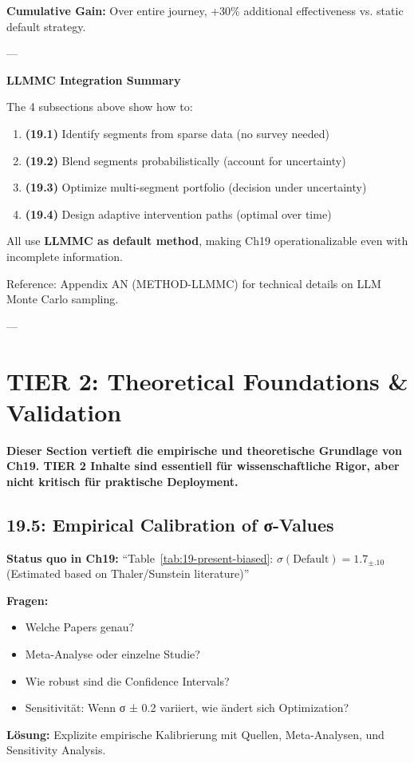 \textbf{Cumulative Gain:} Over entire journey, +30\% additional effectiveness vs. static default strategy.

---

\textbf{LLMMC Integration Summary}

The 4 subsections above show how to:
\begin{enumerate}[nosep]
\item \textbf{(19.1)} Identify segments from sparse data (no survey needed)
\item \textbf{(19.2)} Blend segments probabilistically (account for uncertainty)
\item \textbf{(19.3)} Optimize multi-segment portfolio (decision under uncertainty)
\item \textbf{(19.4)} Design adaptive intervention paths (optimal over time)
\end{enumerate}

All use \textbf{LLMMC as default method}, making Ch19 operationalizable even with incomplete information.

Reference: Appendix AN (METHOD-LLMMC) for technical details on LLM Monte Carlo sampling.

---

\section{TIER 2: Theoretical Foundations \& Validation}
\label{sec:19-tier2}

\textbf{Dieser Section vertieft die empirische und theoretische Grundlage von Ch19. TIER 2 Inhalte sind essentiell für wissenschaftliche Rigor, aber nicht kritisch für praktische Deployment.}

\subsection{19.5: Empirical Calibration of σ-Values}
\label{subsec:19-empirical-calibration}

\begin{tcolorbox}[colback=blue!5!white, colframe=blue!75!black, title=\textbf{Problem: Woher kommen die σ-Werte?}]

\textbf{Status quo in Ch19:}
``Table~\ref{tab:19-present-biased}: $\sigma(\text{Default}) = 1.7_{\pm.10}$ (Estimated based on Thaler/Sunstein literature)''

\textbf{Fragen:}
\begin{itemize}[nosep]
\item Welche Papers genau?
\item Meta-Analyse oder einzelne Studie?
\item Wie robust sind die Confidence Intervals?
\item Sensitivität: Wenn σ ± 0.2 variiert, wie ändert sich Optimization?
\end{itemize}

\textbf{Lösung:} Explizite empirische Kalibrierung mit Quellen, Meta-Analysen, und Sensitivity Analysis.

\end{tcolorbox}

